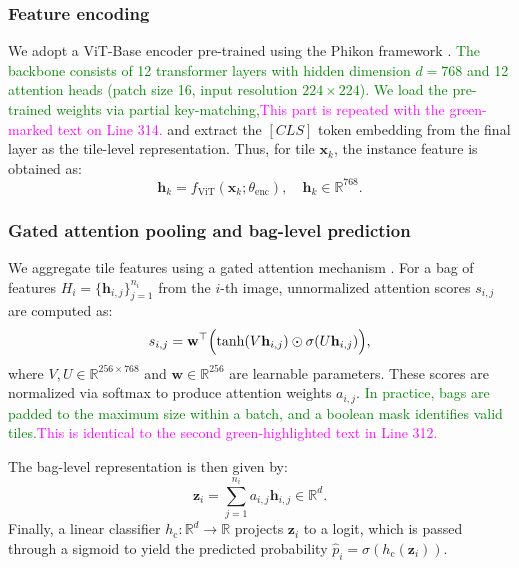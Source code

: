 \documentclass[journal,twoside,web]{ieeecolor}
\begin{document}
\subsubsection{Feature encoding}

We adopt a ViT-Base encoder pre-trained using the Phikon framework \cite{filiot2023scaling}. \textcolor{green}{The backbone consists of 12 transformer layers with hidden dimension \( d = 768 \) and 12 attention heads (patch size 16, input resolution \(224\times224\)). We load the pre-trained weights via partial key-matching,}\textcolor{magenta}{This part is repeated with the green-marked text on Line 314.} and extract the \([CLS]\) token embedding from the final layer as the tile-level representation. Thus, for tile \(\mathbf{x}_k\), the instance feature is obtained as:
\begin{equation*}
    \mathbf{h}_k = f_{\text{ViT}}(\mathbf{x}_k; \theta_{\text{enc}}), \quad \mathbf{h}_k \in \mathbb{R}^{768}.
\end{equation*}

\subsubsection{Gated attention pooling and bag-level prediction}\label{S3-1-3}
We aggregate tile features using a gated attention mechanism \cite{ilse2018attention}. For a bag of features \( H_i = \{\mathbf{h}_{i,j}\}_{j=1}^{n_i} \) from the \( i \)-th image, unnormalized attention scores \( s_{i,j} \) are computed as:
\begin{equation*}
    s_{i,j} = \mathbf{w}^\top \Bigl(\tanh(V\mathbf{h}_{i,j}) \odot \sigma(U\mathbf{h}_{i,j})\Bigr),
\end{equation*}
where \( V, U \in \mathbb{R}^{256 \times 768} \) and \( \mathbf{w} \in \mathbb{R}^{256} \) are learnable parameters. These scores are normalized via softmax to produce attention weights \( a_{i,j} \). \textcolor{green}{In practice, bags are padded to the maximum size within a batch, and a boolean mask identifies valid tiles.}\textcolor{magenta}{This is identical to the second green-highlighted text in Line 312.}

The bag-level representation is then given by:
\begin{equation*}
    \mathbf{z}_i = \sum_{j=1}^{n_i} a_{i,j} \mathbf{h}_{i,j} \in \mathbb{R}^{d}.
\end{equation*}
Finally, a linear classifier \( h_{\mathrm{c}}: \mathbb{R}^{d} \to \mathbb{R} \) projects \( \mathbf{z}_i \) to a logit, which is passed through a sigmoid to yield the predicted probability \(\hat{p}_i = \sigma(h_{\mathrm{c}}(\mathbf{z}_i))\).
\end{document}
